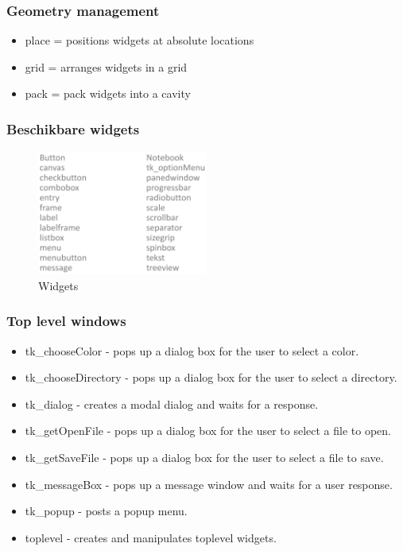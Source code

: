 \documentclass{article}
\begin{document}
\subsubsection{Geometry management}

\begin{itemize}
    \item place = positions widgets at absolute locations
    \item grid = arranges widgets in a grid
    \item pack = pack widgets into a cavity
\end{itemize}

\subsubsection{Beschikbare widgets}

\begin{figure}[H]
    \centering
    \includegraphics[width=0.5\textwidth]{tkinter-widgets.png}
    \caption{Widgets}
\end{figure}

\subsubsection{Top level windows}

\begin{itemize}
    \item tk\_chooseColor - pops up a dialog box for the user to select a color.
    \item tk\_chooseDirectory - pops up a dialog box for the user to select a directory.
    \item tk\_dialog - creates a modal dialog and waits for a response.
    \item tk\_getOpenFile - pops up a dialog box for the user to select a file to open.
    \item tk\_getSaveFile - pops up a dialog box for the user to select a file to save.
    \item tk\_messageBox - pops up a message window and waits for a user response.
    \item tk\_popup - posts a popup menu.
    \item toplevel - creates and manipulates toplevel widgets.
\end{itemize}
\end{document}
